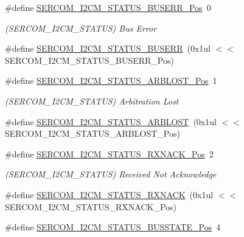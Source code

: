 \begin{DoxyCompactItemize}
\#define \mbox{\hyperlink{group___s_a_m_d21___s_e_r_c_o_m_gabd2448b6fb529ca68147673548f031ed}{S\+E\+R\+C\+O\+M\+\_\+\+I2\+C\+M\+\_\+\+S\+T\+A\+T\+U\+S\+\_\+\+B\+U\+S\+E\+R\+R\+\_\+\+Pos}}~0
\begin{DoxyCompactList}\small\item\em (S\+E\+R\+C\+O\+M\+\_\+\+I2\+C\+M\+\_\+\+S\+T\+A\+T\+US) Bus Error \end{DoxyCompactList}\item 
\#define \mbox{\hyperlink{group___s_a_m_d21___s_e_r_c_o_m_ga17927940eed2ba9b582ea90371b0288a}{S\+E\+R\+C\+O\+M\+\_\+\+I2\+C\+M\+\_\+\+S\+T\+A\+T\+U\+S\+\_\+\+B\+U\+S\+E\+RR}}~(0x1ul $<$$<$ S\+E\+R\+C\+O\+M\+\_\+\+I2\+C\+M\+\_\+\+S\+T\+A\+T\+U\+S\+\_\+\+B\+U\+S\+E\+R\+R\+\_\+\+Pos)
\item 
\#define \mbox{\hyperlink{group___s_a_m_d21___s_e_r_c_o_m_gac5ab7d2d7d0086785d30c3a1020f4d92}{S\+E\+R\+C\+O\+M\+\_\+\+I2\+C\+M\+\_\+\+S\+T\+A\+T\+U\+S\+\_\+\+A\+R\+B\+L\+O\+S\+T\+\_\+\+Pos}}~1
\begin{DoxyCompactList}\small\item\em (S\+E\+R\+C\+O\+M\+\_\+\+I2\+C\+M\+\_\+\+S\+T\+A\+T\+US) Arbitration Lost \end{DoxyCompactList}\item 
\#define \mbox{\hyperlink{group___s_a_m_d21___s_e_r_c_o_m_ga4ae335e8d058fc9d5b30109ec2a9d6bd}{S\+E\+R\+C\+O\+M\+\_\+\+I2\+C\+M\+\_\+\+S\+T\+A\+T\+U\+S\+\_\+\+A\+R\+B\+L\+O\+ST}}~(0x1ul $<$$<$ S\+E\+R\+C\+O\+M\+\_\+\+I2\+C\+M\+\_\+\+S\+T\+A\+T\+U\+S\+\_\+\+A\+R\+B\+L\+O\+S\+T\+\_\+\+Pos)
\item 
\#define \mbox{\hyperlink{group___s_a_m_d21___s_e_r_c_o_m_gad36a5253660fcd371b125d2e149a6e7d}{S\+E\+R\+C\+O\+M\+\_\+\+I2\+C\+M\+\_\+\+S\+T\+A\+T\+U\+S\+\_\+\+R\+X\+N\+A\+C\+K\+\_\+\+Pos}}~2
\begin{DoxyCompactList}\small\item\em (S\+E\+R\+C\+O\+M\+\_\+\+I2\+C\+M\+\_\+\+S\+T\+A\+T\+US) Received Not Acknowledge \end{DoxyCompactList}\item 
\#define \mbox{\hyperlink{group___s_a_m_d21___s_e_r_c_o_m_ga4839bd13b5f300b21641ead6166558bf}{S\+E\+R\+C\+O\+M\+\_\+\+I2\+C\+M\+\_\+\+S\+T\+A\+T\+U\+S\+\_\+\+R\+X\+N\+A\+CK}}~(0x1ul $<$$<$ S\+E\+R\+C\+O\+M\+\_\+\+I2\+C\+M\+\_\+\+S\+T\+A\+T\+U\+S\+\_\+\+R\+X\+N\+A\+C\+K\+\_\+\+Pos)
\item 
\#define \mbox{\hyperlink{group___s_a_m_d21___s_e_r_c_o_m_ga8bd0084b4337f2d729849cb737f83fb9}{S\+E\+R\+C\+O\+M\+\_\+\+I2\+C\+M\+\_\+\+S\+T\+A\+T\+U\+S\+\_\+\+B\+U\+S\+S\+T\+A\+T\+E\+\_\+\+Pos}}~4
$$
\end{DoxyCompactItemize}
